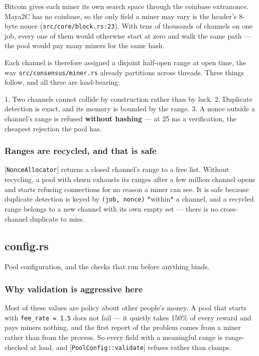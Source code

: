 \documentclass[11pt,a4paper]{article}
\begin{document}
Bitcoin gives each miner its own search space through the coinbase
extranonce. Maya2C has no coinbase, so the only field a miner may vary is
the header's 8-byte nonce (\texttt{src/core/block.rs:23}). With tens of thousands
of channels on one job, every one of them would otherwise start at zero and
walk the same path — the pool would pay many miners for the same hash.

Each channel is therefore assigned a disjoint half-open range at open time,
the way \texttt{src/consensus/miner.rs} already partitions across threads. Three
things follow, and all three are load-bearing:

1. Two channels cannot collide by construction rather than by luck.
2. Duplicate detection is exact, and its memory is bounded by the range.
3. A nonce outside a channel's range is refused \textbf{without hashing} — at
   25 ms a verification, the cheapest rejection the pool has.

\subsubsection{Ranges are recycled, and that is safe}

[\texttt{NonceAllocator}] returns a closed channel's range to a free list. Without
recycling, a pool with churn exhausts its ranges after a few million channel
opens and starts refusing connections for no reason a miner can see. It is
safe because duplicate detection is keyed by \texttt{(job, nonce)} *within* a
channel, and a recycled range belongs to a new channel with its own empty
set — there is no cross-channel duplicate to miss.

\subsection{config.rs}
Pool configuration, and the checks that run before anything binds.

\subsubsection{Why validation is aggressive here}

Most of these values are policy about other people's money. A pool that
starts with \texttt{fee\_rate = 1.5} does not fail — it quietly takes 150\% of every
reward and pays miners nothing, and the first report of the problem comes
from a miner rather than from the process. So every field with a meaningful
range is range-checked at load, and [\texttt{PoolConfig::validate}] refuses rather
than clamps.
\end{document}
